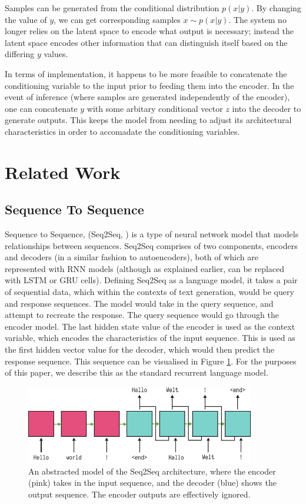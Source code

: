 \documentclass[12pt,twoside]{report}
\begin{document}
Samples can be generated from the conditional distribution $p(x|y)$. By changing the value of $y$, we can get corresponding samples $x \sim p(x|y)$. The system no longer relies on the latent space to encode what output is necessary; instead the latent space encodes other information that can distinguish itself based on the differing $y$ values.

In terms of implementation, it happens to be more feasible to concatenate the conditioning variable to the input prior to feeding them into the encoder. In the event of inference (where samples are generated independently of the encoder), one can concatenate $y$ with some arbitary conditional vector $z$ into the decoder to generate outputs. This keeps the model from needing to adjust its architectural characteristics in order to accomadate the conditioning variables.

\section{Related Work}


\subsection{Sequence To Sequence}
\label{seq2seq}

Sequence to Sequence, (Seq2Seq, \cite{sutskever_sequence_2014}) is a type of neural network model that models relationships between sequences.  Seq2Seq comprises of two components, encoders and decoders (in a similar fashion to autoencoders), both of which are represented with RNN models (although as explained earlier, can be replaced with LSTM or GRU cells). Defining Seq2Seq as a language model, it takes a pair of sequential data, which within the contexts of text generation, would be query and response sequences. The model would take in the query sequence, and attempt to recreate the response. The query sequence would go through the encoder model. The last hidden state value of the encoder is used as the context variable, which encodes the characteristics of the input sequence. This is used as the first hidden vector value for the decoder, which would then predict the response sequence. This sequence can be visualised in Figure \ref{seq2seq_diagram}. For the purposes of this paper, we describe this as the standard recurrent language model.

\begin{figure}[!ht]
		
\centering
\includegraphics[width=100mm]{diagrams/seq2seq.pdf}
\caption{An abstracted model of the Seq2Seq architecture, where the encoder (pink) takes in the input sequence, and the decoder (blue) shows the output sequence. The encoder outputs are effectively ignored. \label{seq2seq_diagram}}
\end{figure}
\end{document}
